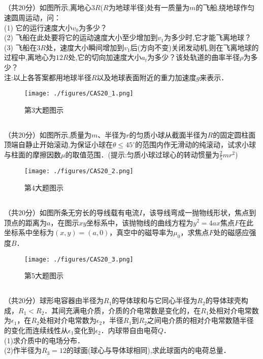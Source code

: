 \subsection{ }
（共20分）如图所示,离地心$3R$($R$为地球半径)处有一质量为$m$的飞船,绕地球作匀速圆周运动，问：\\
(1) 它的运行速度大小$v_{0}$为多少？\\
(2) 飞船在此处要将它的运动速度大小至少增加到$v_{1}$为多少时,它才能飞离地球？\\
(3) 飞船在$3R$处，速度大小瞬间增加到$v_{1}$后(方向不变)关闭发动机,则在飞离地球的过程中,离地心为$12R$处,它的切向加速度大小$a_{t}$为多少？该处轨道的曲率半径$\rho$为多少？\\
注:以上各答案都用地球半径$R$以及地球表面附近的重力加速度$g$来表示．\\
\begin{figure}[ht]
\centering
\texttt{[image: ./figures/CAS20\_1.png]}
\caption{第3大题图示} \label{CAS20_fig1}
\end{figure}

\subsection{ }
（共20分）如图所示,质量为$m$、半径为$r$的匀质小球从截面半径为$R$的固定圆柱面顶端自静止开始滚动,为保证小球在$\theta \le 45^{\circ}$的范围内作无滑动的纯滚动，试求小球与柱面的摩擦因数$\mu$的取值范围．(提示:匀质小球过球心的转动惯量为$\frac{2}{5} mr^{2}$)\\
\begin{figure}[ht]
\centering
\texttt{[image: ./figures/CAS20\_2.png]}
\caption{第4大题图示} \label{CAS20_fig2}
\end{figure}

\subsection{ }
（共20分）如图所条无穷长的导线载有电流$I$，该导线弯成一抛物线形状，焦点到顶点的距离为$a$，在图示$xy$坐标系中，该抛物线的曲线方程为$y^{2}=4ax$焦点$F$在此坐标系中坐标为$(x,y)=(a,0)$，真空中的磁导率为$\mu_{0}$，求焦点$F$处的磁感应强度$B$．\\
\begin{figure}[ht]
\centering
\texttt{[image: ./figures/CAS20\_3.png]}
\caption{第5大题图示} \label{CAS20_fig3}
\end{figure}

\subsection{ }
（共20分）球形电容器由半径为$R_1$的导体球和与它同心半径为$R_2$的导体球壳构成，$R_1<R_2$．其间充满电介质，介质的介电常数是变化的，在$R_1$处相对介电常数为$\epsilon_1$，在$R_2$处相对介电常数为$\epsilon_2$，半径$R_1$到$R_2$之间电介质的相对介电常数随半径的变化而连续线性从$\epsilon_1$变化到$\epsilon_2$．内球带自由电荷$Q$．\\
(1)求介质中的电场分布．\\
(2)作半径为$R_{3}=12$的球面(球心与导体球相同),求此球面内的电荷总量．\\

